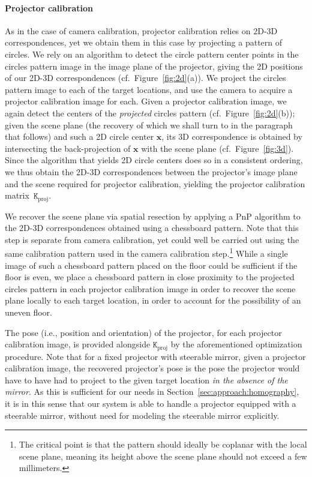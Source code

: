 \documentclass[review]{elsarticle}
\begin{document}
\paragraph{Projector calibration} As in the case of camera calibration, projector calibration relies on 2D-3D correspondences, yet we obtain them in this case by projecting a pattern of circles. We rely on an algorithm to detect the circle pattern center points in the circles pattern image in the image plane of the projector, giving the 2D positions of our 2D-3D correspondences (cf.\ Figure~\ref{fig:2d}(a)). We project the circles pattern image to each of the target locations, and use the camera to acquire a projector calibration image for each. Given a projector calibration image, we again detect the centers of the \textit{projected} circles pattern (cf.\ Figure~\ref{fig:2d}(b)); given the scene plane (the recovery of which we shall turn to in the paragraph that follows) and such a 2D circle center $\mathbf{x}$, its 3D correspondence is obtained by intersecting the back-projection of $\mathbf{x}$ with the scene plane (cf.\ Figure~\ref{fig:3d}). Since the algorithm that yields 2D circle centers does so in a consistent ordering, we thus obtain the 2D-3D correspondences between the projector's image plane and the scene required for projector calibration, yielding the projector calibration matrix~$\mathtt{K}_\text{proj}$.

We recover the scene plane via spatial resection by applying a PnP algorithm \cite{terzakis2020consistently} to the 2D-3D correspondences obtained using a chessboard pattern. Note that this step is separate from camera calibration, yet could well be carried out using the same calibration pattern used in the camera calibration step.\footnote{The critical point is that the pattern should ideally be coplanar with the local scene plane, meaning its height above the scene plane should not exceed a few millimeters.} While a single image of such a chessboard pattern placed on the floor could be sufficient if the floor is even, we place a chessboard pattern in close proximity to the projected circles pattern in each projector calibration image in order to recover the scene plane locally to each target location, in order to account for the possibility of an uneven floor.

The pose (i.e., position and orientation) of the projector, for each projector calibration image, is provided alongside $\mathtt{K}_\text{proj}$ by the aforementioned optimization procedure. Note that for a fixed projector with steerable mirror, given a projector calibration image, the recovered projector's pose is the pose the projector would have to have had to project to the given target location \textit{in the absence of the mirror}. As this is sufficient for our needs in Section~\ref{sec:approach:homography}, it is in this sense that our system is able to handle a projector equipped with a steerable mirror, without need for modeling the steerable mirror explicitly.
\end{document}
